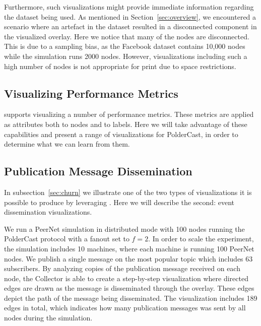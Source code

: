 Furthermore, such visualizations might provide immediate information
regarding the dataset being used. As mentioned in
Section~\ref{sec:overview}, we encountered a scenario where an artefact
in the dataset resulted in a disconnected component in the visualized
overlay. Here we notice that many of the nodes are disconnected. This is
due to a sampling bias, as the Facebook dataset contains 10,000 nodes
while the simulation runs 2000 nodes. However, visualizations including
such a high number of nodes is not appropriate for print due to space
restrictions.

\subsection{Visualizing Performance Metrics}

\demo{} supports visualizing a number of performance metrics. These
metrics are applied as attributes both to nodes and to labels. Here we
will take advantage of these capabilities and present a range of
visualizations for PolderCast, in order to determine what we can learn
from them.

\subsection{Publication Message Dissemination}
\label{sec:dissviz}


In subsection~\ref{sec:churn} we illustrate one of the two types of
visualizations it is possible to produce by leveraging \demo. Here we will describe the second:
event dissemination visualizations.

We run a PeerNet simulation in distributed mode with 100 nodes running
the PolderCast protocol with a fanout set to $f=2$. In order to scale
the experiment, the simulation includes 10 machines, where each machine
is running 100 PeerNet nodes.  We publish a single message on the
most popular topic which includes 63 subscribers. By analyzing copies of
the publication message received on each node, the Collector is able to
create a step-by-step visualization where directed edges are drawn as
the message is disseminated through the overlay.  These edges depict the
path of the message being disseminated. The visualization includes 189
edges in total, which indicates how many publication messages was sent
by all nodes during the simulation.

